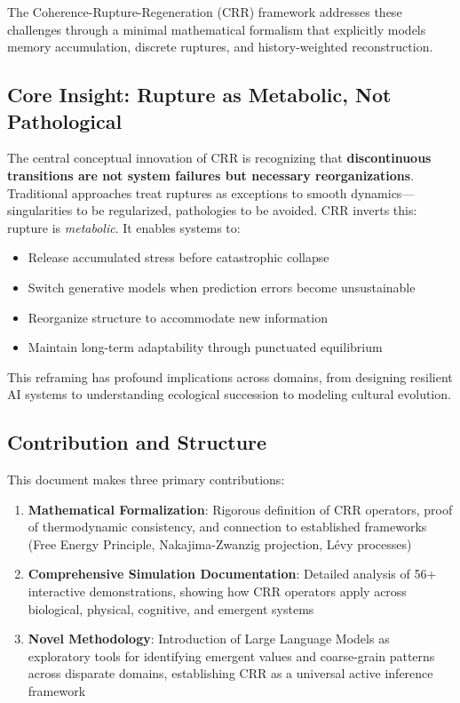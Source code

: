 \documentclass[11pt,a4paper]{article}
\theoremstyle{definition}
\theoremstyle{remark}
\begin{document}
The Coherence-Rupture-Regeneration (CRR) framework addresses these challenges through a minimal mathematical formalism that explicitly models memory accumulation, discrete ruptures, and history-weighted reconstruction.

\subsection{Core Insight: Rupture as Metabolic, Not Pathological}

The central conceptual innovation of CRR is recognizing that \textbf{discontinuous transitions are not system failures but necessary reorganizations}. Traditional approaches treat ruptures as exceptions to smooth dynamics—singularities to be regularized, pathologies to be avoided. CRR inverts this: rupture is \emph{metabolic}. It enables systems to:

\begin{itemize}
\item Release accumulated stress before catastrophic collapse
\item Switch generative models when prediction errors become unsustainable
\item Reorganize structure to accommodate new information
\item Maintain long-term adaptability through punctuated equilibrium
\end{itemize}

This reframing has profound implications across domains, from designing resilient AI systems to understanding ecological succession to modeling cultural evolution.

\subsection{Contribution and Structure}

This document makes three primary contributions:

\begin{enumerate}
\item \textbf{Mathematical Formalization}: Rigorous definition of CRR operators, proof of thermodynamic consistency, and connection to established frameworks (Free Energy Principle, Nakajima-Zwanzig projection, Lévy processes)

\item \textbf{Comprehensive Simulation Documentation}: Detailed analysis of 56+ interactive demonstrations, showing how CRR operators apply across biological, physical, cognitive, and emergent systems

\item \textbf{Novel Methodology}: Introduction of Large Language Models as exploratory tools for identifying emergent values and coarse-grain patterns across disparate domains, establishing CRR as a universal active inference framework
\end{enumerate}
\end{document}
